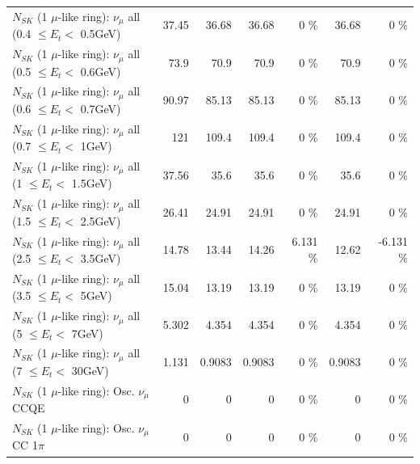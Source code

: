 \begin{table}
\begin{tabular}{| l | r | r | r  r | r  r |}
       $N_{SK}$ (1 $\mu$-like ring): $\nu_{\mu}$ all (0.4 $\leq E_{t} <$ 0.5GeV) &           37.45 &           36.68 &           36.68 &        0 \%  &           36.68 &        0 \%  \\ 
       $N_{SK}$ (1 $\mu$-like ring): $\nu_{\mu}$ all (0.5 $\leq E_{t} <$ 0.6GeV) &            73.9 &            70.9 &            70.9 &        0 \%  &            70.9 &        0 \%  \\ 
       $N_{SK}$ (1 $\mu$-like ring): $\nu_{\mu}$ all (0.6 $\leq E_{t} <$ 0.7GeV) &           90.97 &           85.13 &           85.13 &        0 \%  &           85.13 &        0 \%  \\ 
         $N_{SK}$ (1 $\mu$-like ring): $\nu_{\mu}$ all (0.7 $\leq E_{t} <$ 1GeV) &             121 &           109.4 &           109.4 &        0 \%  &           109.4 &        0 \%  \\ 
         $N_{SK}$ (1 $\mu$-like ring): $\nu_{\mu}$ all (1 $\leq E_{t} <$ 1.5GeV) &           37.56 &            35.6 &            35.6 &        0 \%  &            35.6 &        0 \%  \\ 
       $N_{SK}$ (1 $\mu$-like ring): $\nu_{\mu}$ all (1.5 $\leq E_{t} <$ 2.5GeV) &           26.41 &           24.91 &           24.91 &        0 \%  &           24.91 &        0 \%  \\ 
       $N_{SK}$ (1 $\mu$-like ring): $\nu_{\mu}$ all (2.5 $\leq E_{t} <$ 3.5GeV) &           14.78 &           13.44 &           14.26 &    6.131 \%  &           12.62 &   -6.131 \%  \\ 
         $N_{SK}$ (1 $\mu$-like ring): $\nu_{\mu}$ all (3.5 $\leq E_{t} <$ 5GeV) &           15.04 &           13.19 &           13.19 &        0 \%  &           13.19 &        0 \%  \\ 
           $N_{SK}$ (1 $\mu$-like ring): $\nu_{\mu}$ all (5 $\leq E_{t} <$ 7GeV) &           5.302 &           4.354 &           4.354 &        0 \%  &           4.354 &        0 \%  \\ 
          $N_{SK}$ (1 $\mu$-like ring): $\nu_{\mu}$ all (7 $\leq E_{t} <$ 30GeV) &           1.131 &          0.9083 &          0.9083 &        0 \%  &          0.9083 &        0 \%  \\ 
\hline
\hline
                               $N_{SK}$ (1 $\mu$-like ring): Osc. $\nu_\mu$ CCQE &               0 &               0 &               0 &        0 \%  &               0 &        0 \%  \\ 
                          $N_{SK}$ (1 $\mu$-like ring): Osc. $\nu_\mu$ CC 1$\pi$ &               0 &               0 &               0 &        0 \%  &               0 &        0 \%  \\ 

\end{tabular}
\end{table}

